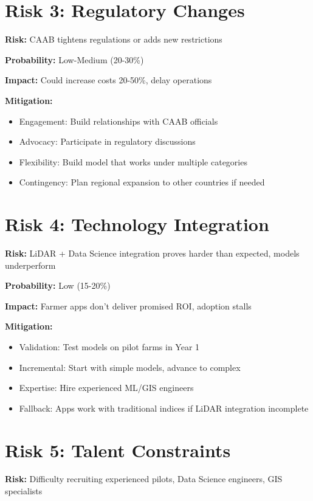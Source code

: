 \section{Risk 3: Regulatory Changes}

\textbf{Risk:} CAAB tightens regulations or adds new restrictions

\textbf{Probability:} Low-Medium (20-30\%)

\textbf{Impact:} Could increase costs 20-50\%, delay operations

\textbf{Mitigation:}
\begin{itemize}
    \item Engagement: Build relationships with CAAB officials
    \item Advocacy: Participate in regulatory discussions
    \item Flexibility: Build model that works under multiple categories
    \item Contingency: Plan regional expansion to other countries if needed
\end{itemize}

\section{Risk 4: Technology Integration}

\textbf{Risk:} LiDAR + Data Science integration proves harder than expected, models underperform

\textbf{Probability:} Low (15-20\%)

\textbf{Impact:} Farmer apps don't deliver promised ROI, adoption stalls

\textbf{Mitigation:}
\begin{itemize}
    \item Validation: Test models on pilot farms in Year 1
    \item Incremental: Start with simple models, advance to complex
    \item Expertise: Hire experienced ML/GIS engineers
    \item Fallback: Apps work with traditional indices if LiDAR integration incomplete
\end{itemize}

\section{Risk 5: Talent Constraints}

\textbf{Risk:} Difficulty recruiting experienced pilots, Data Science engineers, GIS specialists

